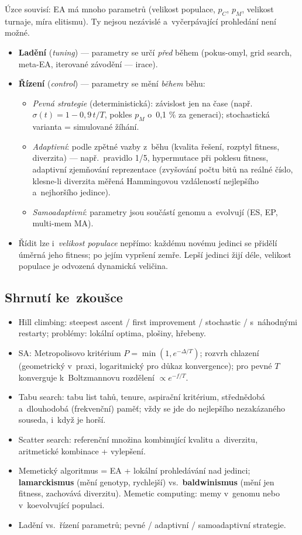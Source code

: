 \documentclass[11pt,a4paper]{article}
\theoremstyle{definition}
\begin{document}
Úzce souvisí: EA má mnoho parametrů (velikost populace, $p_C$, $p_M$, velikost
turnaje, míra elitismu). Ty nejsou nezávislé a~vyčerpávající prohledání není
možné.
\begin{itemize}
\item \textbf{Ladění} (\emph{tuning}) --- parametry se určí \emph{před} během
  (pokus-omyl, grid search, meta-EA, iterované závodění --- irace).
\item \textbf{Řízení} (\emph{control}) --- parametry se mění \emph{během} běhu:
  \begin{itemize}
  \item \emph{Pevná strategie} (deterministická): závislost jen na čase
    (např.\ $\sigma(t) = 1 - 0{,}9\,t/T$, pokles $p_M$ o~0{,}1 \% za generaci);
    stochastická varianta = simulované žíhání.
  \item \emph{Adaptivní}: podle zpětné vazby z~běhu (kvalita řešení, rozptyl
    fitness, diverzita) --- např.\ pravidlo 1/5, hypermutace při poklesu
    fitness, adaptivní zjemňování reprezentace (zvyšování počtu bitů na
    reálné číslo, klesne-li diverzita měřená Hammingovou vzdáleností nejlepšího
    a~nejhoršího jedince).
  \item \emph{Samoadaptivní}: parametry jsou součástí genomu a~evolvují
    (ES, EP, multi-mem MA).
  \end{itemize}
\item Řídit lze i~\emph{velikost populace} nepřímo: každému novému jedinci se
  přidělí  úměrná jeho fitness; po jejím vypršení zemře.
  Lepší jedinci žijí déle, velikost populace je odvozená dynamická veličina.
\end{itemize}

\subsection{Shrnutí ke~zkoušce}

\begin{itemize}
\item Hill climbing: steepest ascent / first improvement / stochastic /
  s~náhodnými restarty; problémy: lokální optima, plošiny, hřebeny.
\item SA: Metropolisovo kritérium $P = \min(1, e^{-\Delta/T})$; rozvrh chlazení
  (geometrický v~praxi, logaritmický pro důkaz konvergence); pro pevné $T$
  konverguje k~Boltzmannovu rozdělení $\propto e^{-f/T}$.
\item Tabu search: tabu list tahů, tenure, aspirační kritérium, střednědobá
  a~dlouhodobá (frekvenční) paměť; vždy se jde do nejlepšího nezakázaného
  souseda, i~když je horší.
\item Scatter search: referenční množina kombinující kvalitu a~diverzitu,
  aritmetické kombinace + vylepšení.
\item Memetický algoritmus = EA + lokální prohledávání nad jedinci;
  \textbf{lamarckismus} (mění genotyp, rychlejší) vs.\ \textbf{baldwinismus}
  (mění jen fitness, zachovává diverzitu). Memetic computing: memy v~genomu
  nebo v~koevolvující populaci.
\item Ladění vs.\ řízení parametrů; pevné / adaptivní / samoadaptivní strategie.
\end{itemize}
\end{document}
